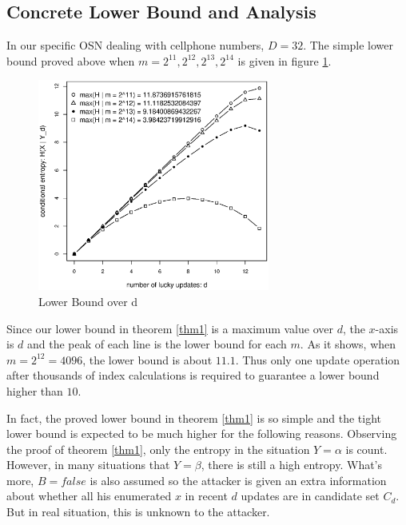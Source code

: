 \documentclass[10pt, conference, compsocconf]{IEEEtran}
\begin{document}
    \subsection{Concrete Lower Bound and Analysis}
        In our specific OSN dealing with cellphone numbers,
        $D = 32$.
        The simple lower
        bound proved above when $m = 2^{11}, 2^{12}, 2^{13}, 2^{14}$ is given
        in figure \ref{lb_m}.

        \begin{figure}[!t]
        \centering
        \includegraphics[width=3in, trim=0mm 0mm 0mm 20mm]{lb_m.eps}
        \caption{Lower Bound over d}\label{lb_m}
        \end{figure}

        Since our lower bound in theorem \ref{thm1} is a maximum value
        over $d$, the $x$-axis is $d$ and the peak of each line
        is the lower bound for each $m$. As it shows, when $m = 2^{12} = 4096$, the lower
        bound is about $11.1$.
        Thus only one update operation after thousands of index calculations is required
        to guarantee a lower bound higher than $10$.

        In fact, the proved lower bound in theorem \ref{thm1} is so
        simple and the tight lower bound is expected to be much higher
        for the following reasons.
        Observing the proof of theorem \ref{thm1}, only the
        entropy in the situation $Y = \alpha$ is count. However, in
        many situations that $Y = \beta$, there is still a high entropy.
        What's more, $B = false$ is also assumed so the attacker is
        given an extra information about whether all his enumerated $x$
        in recent $d$ updates are in candidate set $C_d$. But
        in real situation, this is unknown to the attacker.
\end{document}
